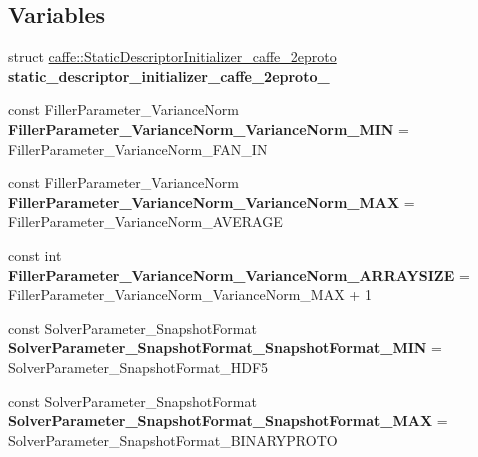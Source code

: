 \subsection*{Variables}
\begin{DoxyCompactItemize}
\item 
\mbox{\label{namespacecaffe_a5059f8c72dae38c6442ed1601ef5fef1}} 
struct \mbox{\hyperlink{structcaffe_1_1_static_descriptor_initializer__caffe__2eproto}{caffe\+::\+Static\+Descriptor\+Initializer\+\_\+caffe\+\_\+2eproto}} {\bfseries static\+\_\+descriptor\+\_\+initializer\+\_\+caffe\+\_\+2eproto\+\_\+}
\item 
\mbox{\label{namespacecaffe_a8cf627c42e2437ebb1788b653a19ad9f}} 
const Filler\+Parameter\+\_\+\+Variance\+Norm {\bfseries Filler\+Parameter\+\_\+\+Variance\+Norm\+\_\+\+Variance\+Norm\+\_\+\+M\+IN} = Filler\+Parameter\+\_\+\+Variance\+Norm\+\_\+\+F\+A\+N\+\_\+\+IN
\item 
\mbox{\label{namespacecaffe_a3719a496537ab6d80da78586c70e7ad4}} 
const Filler\+Parameter\+\_\+\+Variance\+Norm {\bfseries Filler\+Parameter\+\_\+\+Variance\+Norm\+\_\+\+Variance\+Norm\+\_\+\+M\+AX} = Filler\+Parameter\+\_\+\+Variance\+Norm\+\_\+\+A\+V\+E\+R\+A\+GE
\item 
\mbox{\label{namespacecaffe_a74aa6cd7eebfdf28d9dab0ade133a5ed}} 
const int {\bfseries Filler\+Parameter\+\_\+\+Variance\+Norm\+\_\+\+Variance\+Norm\+\_\+\+A\+R\+R\+A\+Y\+S\+I\+ZE} = Filler\+Parameter\+\_\+\+Variance\+Norm\+\_\+\+Variance\+Norm\+\_\+\+M\+AX + 1
\item 
\mbox{\label{namespacecaffe_a88d99f77ac6becdb321625381a20dd40}} 
const Solver\+Parameter\+\_\+\+Snapshot\+Format {\bfseries Solver\+Parameter\+\_\+\+Snapshot\+Format\+\_\+\+Snapshot\+Format\+\_\+\+M\+IN} = Solver\+Parameter\+\_\+\+Snapshot\+Format\+\_\+\+H\+D\+F5
\item 
\mbox{\label{namespacecaffe_af8dbd15e0dd42311f71cf2fb0477f152}} 
const Solver\+Parameter\+\_\+\+Snapshot\+Format {\bfseries Solver\+Parameter\+\_\+\+Snapshot\+Format\+\_\+\+Snapshot\+Format\+\_\+\+M\+AX} = Solver\+Parameter\+\_\+\+Snapshot\+Format\+\_\+\+B\+I\+N\+A\+R\+Y\+P\+R\+O\+TO
\item 
\mbox{\label{namespacecaffe_a6ffe9488e63401cba39b07839a75a201}} 

\end{DoxyCompactItemize}
